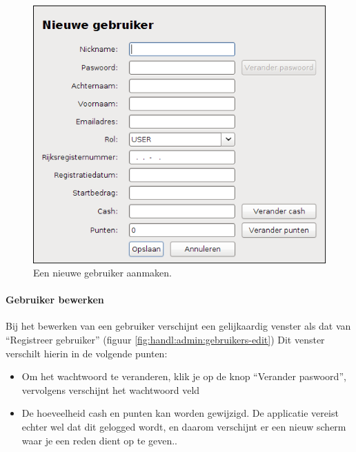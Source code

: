 \begin{figure}[h!]
	\centering
		\includegraphics[scale=0.75]{images/handleiding/administratie/gebruikers-nieuw}
	\caption{Een nieuwe gebruiker aanmaken.}
		\label{fig:handl:admin:gebruikers-nieuw}
\end{figure}

\paragraph{Gebruiker bewerken}

Bij het bewerken van een gebruiker verschijnt een gelijkaardig venster als dat van ``Registreer gebruiker'' (figuur \ref{fig:handl:admin:gebruikers-edit})
Dit venster verschilt hierin in de volgende punten:

\begin{itemize}
\item{Om het wachtwoord te veranderen, klik je op de knop ``Verander paswoord'', vervolgens verschijnt het wachtwoord veld}
\item{De hoeveelheid cash en punten kan worden gewijzigd. De applicatie vereist echter wel dat dit gelogged wordt, en daarom verschijnt er een nieuw scherm waar je een reden dient op te geven..}
\end{itemize}


